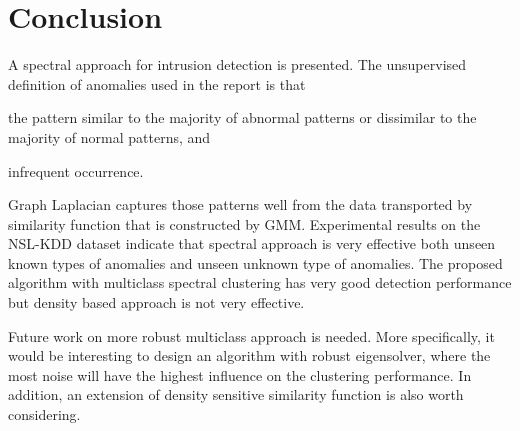 \section{Conclusion}
A spectral approach for intrusion detection is presented. 
The unsupervised definition of anomalies used in the report is that 
\begin{inparaenum}
\item the pattern similar to the majority of abnormal patterns or dissimilar to the majority of normal patterns, and
\item infrequent occurrence.
\end{inparaenum}
Graph Laplacian captures those patterns well from the data transported by similarity function that is constructed by GMM. 
Experimental results on the NSL-KDD dataset indicate that spectral approach is very effective both unseen known types of anomalies and unseen unknown type of anomalies. 
The proposed algorithm with multiclass spectral clustering has very good detection performance but density based approach is not very effective. 

Future work on more robust multiclass approach is needed. 
More specifically, it would be interesting to design an algorithm with robust eigensolver, where the most noise will have the highest influence on the clustering performance. 
In addition, an extension of density sensitive similarity function is also worth considering. 

